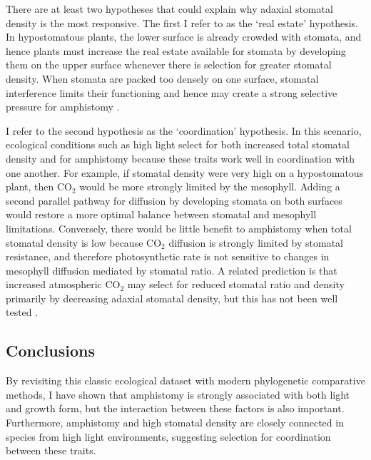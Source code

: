 \documentclass[12pt, oneside]{article}
\begin{document}
There are at least two hypotheses that could explain why adaxial stomatal density is the most responsive. The first I refer to as the `real estate' hypothesis. In hypostomatous plants, the lower surface is already crowded with stomata, and hence plants must increase the real estate available for stomata by developing them on the upper surface whenever there is selection for greater stomatal density. When stomata are packed too densely on one surface, stomatal interference limits their functioning and hence may create a strong selective pressure for amphistomy \citep{Parlange_Waggoner_1970, Dow_etal_2014a}. 

I refer to the second hypothesis as the `coordination' hypothesis. In this scenario, ecological conditions such as high light select for both increased total stomatal density and for amphistomy because these traits work well in coordination with one another. For example, if stomatal density were very high on a hypostomatous plant, then CO$_2$ would be more strongly limited by the mesophyll. Adding a second parallel pathway for diffusion by developing stomata on both surfaces would restore a more optimal balance between stomatal and mesophyll limitations. Conversely, there would be little benefit to amphistomy when total stomatal density is low because CO$_2$ diffusion is strongly limited by stomatal resistance, and therefore photosynthetic rate is not sensitive to changes in mesophyll diffusion mediated by stomatal ratio. A related prediction is that increased atmospheric CO$_2$ may select for reduced stomatal ratio and density primarily by decreasing adaxial stomatal density, but this has not been well tested \citep[but see][]{Woodward_Bazzaz_1988}.

\subsection*{Conclusions}

By revisiting this classic ecological dataset with modern phylogenetic comparative methods, I have shown that amphistomy is strongly associated with both light and growth form, but the interaction between these factors is also important. Furthermore, amphistomy and high stomatal density are closely connected in species from high light environments, suggesting selection for coordination between these traits.

\end{document}
